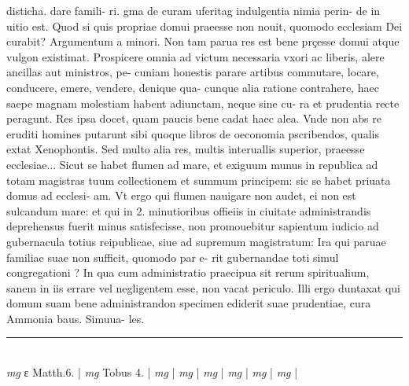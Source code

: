 \documentclass{article}
\begin{document}
\begin{pages}
disticha. dare famili- ri. gma de curam uferitag indulgentia nimia perin- de in uitio est.  \pend\pstart Quod si quis propriae domui praeesse non nouit, quomodo ecclesiam Dei curabit? Argumentum a minori. Non tam parua res est bene prçesse domui atque vulgon existimat. Prospicere omnia ad victum necessaria vxori ac liberis, alere ancillas aut ministros, pe- cuniam honestis parare artibus commutare, locare, conducere, emere, vendere, denique qua- cunque alia ratione contrahere, haec saepe magnam molestiam habent adiunctam, neque sine cu- ra et prudentia recte peragunt. Res ipsa docet, quam paucis bene cadat haec alea. Vnde non abs re eruditi homines putarunt sibi quoque libros de oeconomia pscribendos, qualis extat Xenophontis. Sed multo alia res, multis interuallis superior, praeesse ecclesiae... Sicut se habet flumen ad mare, et exiguum munus in republica ad totam magistras tuum collectionem et summum principem: sic se habet priuata domus ad ecclesi- am. Vt ergo qui flumen nauigare non audet, ei non est sulcandum mare: et qui in 2. minutioribus offieiis in ciuitate administrandis deprehensus fuerit minus satisfecisse, non promouebitur sapientum iudicio ad gubernacula totius reipublicae, siue ad supremum magistratum: Ira qui paruae familiae suae non sufficit, quomodo par e- rit gubernandae toti simul congregationi ? In qua cum administratio praecipua sit rerum spiritualium, sanem in iis errare vel negligentem esse, non vacat periculo. Illi ergo duntaxat qui domum suam bene administrandon specimen ediderit suae prudentiae, cura Ammonia baus. Simuua- les.  \pend
\vspace{0.5cm}\noindent
\vspace{0.2cm}\rule{1cm}{0.2pt}\\ 
\hspace{0.2cm}\textit{mg}
\footnotesize ε Matth.6. 
\normalsize| 
\hspace{0.2cm}\textit{mg}
\footnotesize Tobus 4. 
\normalsize| 
\hspace{0.2cm}\textit{mg}
\footnotesize 
\normalsize| 
\hspace{0.2cm}\textit{mg}
\footnotesize 
\normalsize| 
\hspace{0.2cm}\textit{mg}
\footnotesize 
\normalsize| 
\hspace{0.2cm}\textit{mg}
\footnotesize 
\normalsize| 
\hspace{0.2cm}\textit{mg}
\footnotesize 
\normalsize| 
\hspace{0.2cm}\textit{mg}
\footnotesize 
\normalsize| 

\end{pages}
\end{document}
